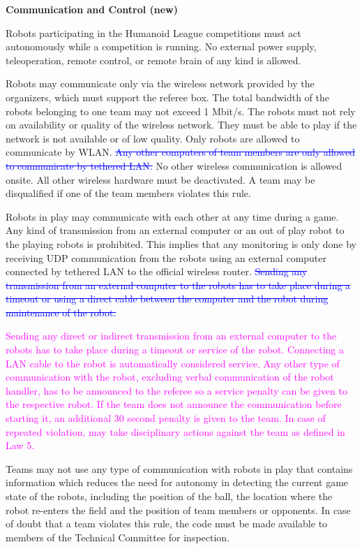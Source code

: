 {\bfseries Communication and Control (new)}

\headlinebox

Robots participating in the Humanoid League competitions must act autonomously while a competition is running. No external power supply, teleoperation, remote control, or remote brain of any kind is allowed.

\bigskip

Robots may communicate only via the wireless network provided by the organizers, which must support the referee box. The total bandwidth of the robots belonging to one team may not exceed 1 Mbit/s. The robots must not rely on availability or quality of the wireless network. They
must be able to play if the network is not available or of low quality. Only robots are allowed to communicate by WLAN.  \textcolor{blue}{\sout{Any other computers of team members are only allowed to communicate by tethered LAN.}} No other wireless communication is allowed onsite. All other wireless hardware must be deactivated. A team may be disqualified if one of the team members violates this rule.

\bigskip

Robots in play may communicate with each other at any time during a game. Any kind of transmission from an external computer or an out of play robot to the playing robots is prohibited. This implies that any monitoring is only done by receiving UDP communication from the robots using an external computer connected by tethered LAN to the official wireless router. \textcolor{blue}{\sout{Sending any transmission from an external computer to the robots has to take place during a timeout or using a direct cable between the computer and the robot during maintenance of the robot.}}

\bigskip

\textcolor{magenta}{Sending any direct or indirect transmission from an external computer to the robots has to take place during a timeout or service of the robot. Connecting a LAN cable to the robot is automatically considered service. Any other type of communication with the robot, excluding verbal communication of the robot handler, has to be announced to the referee so a service penalty can be given to the respective robot. If the team does not announce the communication before starting it, an additional 30 second penalty is given to the team. In case of repeated violation, may take disciplinary actions against the team as defined in Law 5.}
\bigskip

Teams may not use any type of communication with robots in play that contains information which reduces the need for autonomy in detecting the current game state of the robots, including the position of the ball, the location where the robot re-enters the field and the position of team members or opponents. In case of doubt that a team violates this rule, the code must be made available to members of the Technical Committee for inspection.

